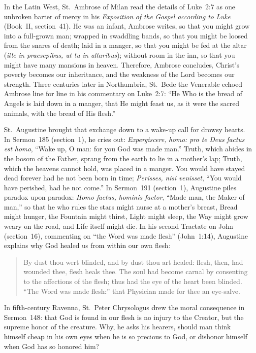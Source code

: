 In the Latin West, St.~Ambrose of Milan read the details of Luke~2:7 as one
unbroken barter of mercy in his \textit{Exposition of the Gospel according to
Luke} (Book~II, section~41). He was an infant, Ambrose writes, so that you might
grow into a full-grown man; wrapped in swaddling bands, so that you might be
loosed from the snares of death; laid in a manger, so that you might be fed at
the altar (\textit{ille in praesepibus, ut tu in altaribus}); without room in the inn, so that you might have many mansions in heaven.
Therefore, Ambrose concludes, Christ's poverty becomes our inheritance, and the
weakness of the Lord becomes our strength. Three centuries later in Northumbria, St.~Bede the
Venerable echoed Ambrose line for line in his commentary on Luke~2:7: ``He Who
is the bread of Angels is laid down in a manger, that He might feast us, as it
were the sacred animals, with the bread of His flesh.''

St.~Augustine brought that exchange down to a wake-up call for drowsy hearts.
In Sermon~185 (section~1), he cries out: \textit{Expergiscere, homo: pro te Deus
factus est homo}, ``Wake up, O man: for you God was made man.'' Truth, which
abides in the bosom of the Father, sprang from the earth to lie in a mother's
lap; Truth, which the heavens cannot hold, was placed in a manger. You would
have stayed dead forever had he not been born in time; \textit{Perisses, nisi
venisset}, ``You would have perished, had he not come.'' In Sermon~191
(section~1), Augustine piles paradox upon paradox: \textit{Homo factus, hominis
factor}, ``Made man, the Maker of man,'' so that he who rules the stars might
nurse at a mother's breast, Bread might hunger, the Fountain might thirst, Light
might sleep, the Way might grow weary on the road, and Life itself might die. In
his second Tractate on John (section~16), commenting on ``the Word was made
flesh'' (John~1:14), Augustine explains why God healed us from within our own
flesh:

\begin{quote}
By dust thou wert blinded, and by dust thou art healed: flesh, then, had wounded
thee, flesh heals thee. The soul had become carnal by consenting to the
affections of the flesh; thus had the eye of the heart been blinded. ``The Word
was made flesh:'' that Physician made for thee an eye-salve.
\end{quote}

In fifth-century Ravenna, St.~Peter Chrysologus drew the moral consequence in
Sermon~148: that God is found in our flesh is no injury to the Creator, but the
supreme honor of the creature. Why, he asks his hearers, should man think
himself cheap in his own eyes when he is so precious to God, or dishonor himself
when God has so honored him?

